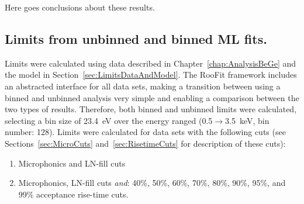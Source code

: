 Here goes conclusions about these results.

	\subsection{Limits from unbinned and binned ML fits.}
	\label{sec:LimitsUnbinned}
			
Limits were calculated using data described in Chapter~\ref{chap:AnalysisBeGe} and the model in Section~\ref{sec:LimitsDataAndModel}.  The RooFit framework includes an abstracted interface for all data sets, making a transition between using a binned and unbinned analysis very simple and enabling a comparison between the two types of results.  Therefore, both binned and unbinned limits were calculated, selecting a bin size of 23.4~eV over the energy ranged (0.5$\to$3.5~keV, bin number: 128).  Limits were calculated for data sets with the following cuts (see Sections~\ref{sec:MicroCuts} and~\ref{sec:RisetimeCuts} for description of these cuts):
	\begin{enumerate}	
		\item Microphonics and LN-fill cuts
		\item Microphonics, LN-fill cuts \emph{and}: 40\%, 50\%, 60\%, 70\%, 80\%, 90\%, 95\%, and 99\%
		acceptance rise-time cuts.
	\end{enumerate}
